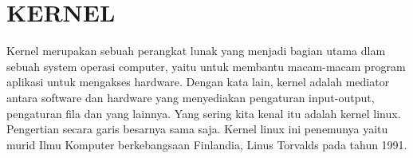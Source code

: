 \section{KERNEL}
Kernel merupakan sebuah perangkat lunak yang menjadi bagian utama dlam sebuah system operasi computer, yaitu untuk membantu macam-macam program aplikasi untuk mengakses hardware. 
Dengan kata lain, kernel adalah mediator antara software dan hardware yang menyediakan pengaturan input-output, pengaturan fila dan yang lainnya. 
Yang sering kita kenal itu adalah kernel linux. Pengertian secara garis besarnya sama saja. Kernel linux ini penemunya yaitu  murid Ilmu Komputer berkebangsaan Finlandia, Linus Torvalds pada tahun 1991.
